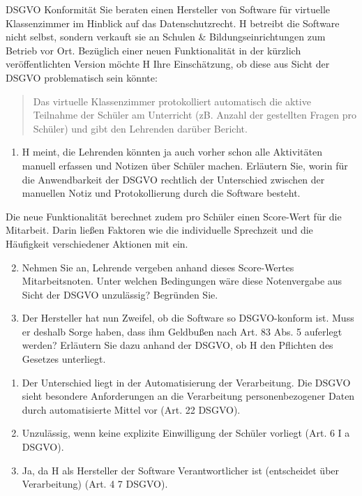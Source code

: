\documentclass{article}
\begin{document}
\begin{exercise}{DSGVO Konformität}
  Sie beraten einen Hersteller von Software für virtuelle Klassenzimmer im Hinblick auf das Datenschutzrecht. H betreibt die Software nicht selbst, sondern verkauft sie an Schulen \& Bildungseinrichtungen zum Betrieb vor Ort. Bezüglich einer neuen Funktionalität in der kürzlich veröffentlichten Version möchte H Ihre Einschätzung, ob diese aus Sicht der DSGVO problematisch sein könnte:
  \begin{quote}
    Das virtuelle Klassenzimmer protokolliert automatisch die aktive Teilnahme der Schüler am Unterricht (zB. Anzahl der gestellten Fragen pro Schüler) und gibt den Lehrenden darüber Bericht.
  \end{quote}

  \begin{enumerate}
    \item H meint, die Lehrenden könnten ja auch vorher schon alle Aktivitäten manuell erfassen und Notizen über Schüler machen. Erläutern Sie, worin für die Anwendbarkeit der DSGVO rechtlich der Unterschied zwischen der manuellen Notiz und Protokollierung durch die Software besteht.
  \end{enumerate}

  Die neue Funktionalität berechnet zudem pro Schüler einen Score-Wert für die Mitarbeit. Darin ließen Faktoren wie die individuelle Sprechzeit und die Häufigkeit verschiedener Aktionen mit ein.

  \begin{enumerate}
    \setcounter{enumi}{1}
    \item Nehmen Sie an, Lehrende vergeben anhand dieses Score-Wertes Mitarbeitsnoten. Unter welchen Bedingungen wäre diese Notenvergabe aus Sicht der DSGVO unzulässig? Begründen Sie.
    \item Der Hersteller hat nun Zweifel, ob die Software so DSGVO-konform ist. Muss er deshalb Sorge haben, dass ihm Geldbußen nach Art. 83 Abs. 5 auferlegt werden? Erläutern Sie dazu anhand der DSGVO, ob H den Pflichten des Gesetzes unterliegt.
  \end{enumerate}

  \begin{solution}
    \begin{enumerate}
      \item Der Unterschied liegt in der Automatisierung der Verarbeitung. Die DSGVO sieht besondere Anforderungen an die Verarbeitung personenbezogener Daten durch automatisierte Mittel vor (Art. 22 DSGVO).
      \item Unzulässig, wenn keine explizite Einwilligung der Schüler vorliegt (Art. 6 I a DSGVO).
      \item Ja, da H als Hersteller der Software Verantwortlicher ist (entscheidet über Verarbeitung) (Art. 4 7 DSGVO).
    \end{enumerate}
  \end{solution}
\end{exercise}
\end{document}
